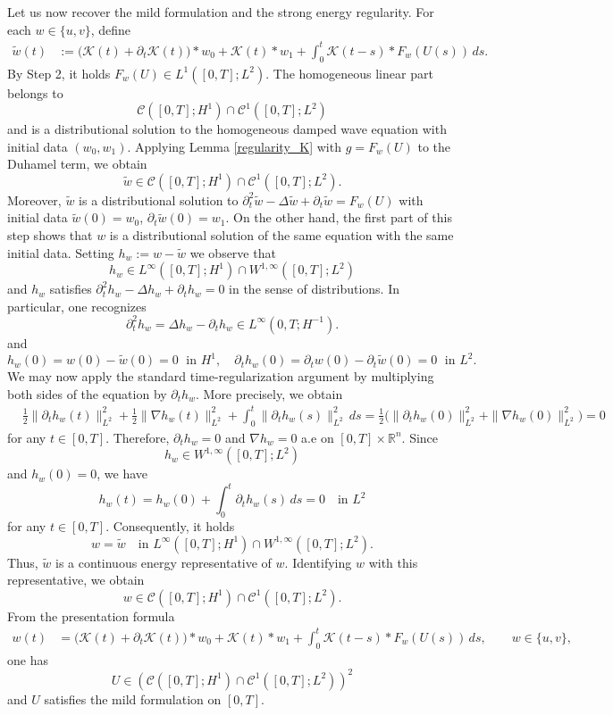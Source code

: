 \documentclass[11pt,reqno]{amsart}
\begin{document}
	Let us now recover the mild formulation and the strong energy regularity.
	For each $w\in\{u,v\}$, define
	\[
	\begin{aligned}
		\widetilde w(t)
		&:=\bigl(\mathcal K(t)+\partial_t\mathcal K(t)\bigr)*w_0
		+\mathcal K(t)*w_1
		+\int_0^t\mathcal K(t-s)*F_w(U(s))\,ds.
	\end{aligned}
	\]
	By Step 2, it holds $F_w(U)\in L^1([0,T];L^2)$. The homogeneous linear part belongs to
	\[
	\mathcal{C}([0,T];H^1)
	\cap \mathcal{C}^1([0,T];L^2)
	\]
	and is a distributional solution to the homogeneous damped wave equation with initial data $(w_0,w_1)$. Applying Lemma \ref{regularity_K} with $g=F_w(U)$ to the Duhamel term, we obtain
	\[
	\widetilde w\in \mathcal{C}([0,T];H^1)
	\cap \mathcal{C}^1([0,T];L^2).
	\]
	Moreover, $\widetilde w$ is a distributional solution to $\partial_t^2\widetilde w-\Delta\widetilde w
	+\partial_t\widetilde w=F_w(U)$ with initial data $\widetilde w(0)=w_0$, $\partial_t\widetilde w(0)=w_1$. On the other hand, the first part of this step shows that $w$ is a distributional solution of the same equation with the same initial data. Setting $h_w:=w-\widetilde w$ we observe that
	\[
	h_w\in L^\infty([0,T];H^1)\cap W^{1,\infty}([0,T];L^2)
	\]
	and $h_w$ satisfies $\partial_t^2h_w-\Delta h_w+\partial_th_w=0$ in the sense of distributions. In particular, one recognizes
	\[
	\partial_t^2h_w=\Delta h_w-\partial_th_w
	\in L^\infty(0,T;H^{-1}).
	\]
	and 
	\[
	h_w(0)=w(0)-\widetilde w(0)=0
	\;\text{ in }H^1,\quad \partial_th_w(0)=\partial_tw(0)-\partial_t\widetilde w(0)=0\;\text{ in }L^2.
	\]
	We may now apply the standard time-regularization argument by multiplying both sides of the equation by $\partial_th_w$. More precisely, we obtain
	\[
	\begin{aligned}
		&\frac12\|\partial_th_w(t)\|_{L^2}^2+\frac12\|\nabla h_w(t)\|_{L^2}^2+\int_0^t\|\partial_th_w(s)\|_{L^2}^2\,ds=\frac12\Big(\|\partial_th_w(0)\|_{L^2}^2+ \|\nabla h_w(0)\|_{L^2}^2\Big)=0
	\end{aligned}
	\]
	for any $t\in[0,T]$. Therefore, $\partial_th_w=0$ and $\nabla h_w=0$ a.e on $[0,T]\times\mathbb R^n$. Since 
	\[
	h_w\in W^{1,\infty}([0,T];L^2)
	\]
	and $h_w(0)=0$, we have
	\[
	h_w(t)=h_w(0)+\int_0^t\partial_th_w(s)\,ds=0 \quad\text{in }L^2
	\]
	for any $t\in[0,T]$. Consequently, it holds
	\[
	w=\widetilde w \quad\text{in }L^\infty([0,T];H^1)\cap W^{1,\infty}([0,T];L^2).
	\]
	Thus, $\widetilde w$ is a continuous energy representative of $w$. Identifying $w$ with this representative, we obtain
	\[
	w\in \mathcal{C}([0,T];H^1) \cap \mathcal{C}^1([0,T];L^2).
	\]
	From the presentation formula
	\[
	\begin{aligned}
		w(t)&=\bigl(\mathcal K(t)+\partial_t\mathcal K(t)\bigr)*w_0+\mathcal K(t)*w_1+\int_0^t\mathcal K(t-s)*F_w(U(s))\,ds,\qquad w\in\{u,v\},
	\end{aligned}
	\]
	one has
	\begin{equation}\label{remove_compact_eq10}
		U\in\left(\mathcal{C}([0,T];H^1)\cap \mathcal{C}^1([0,T];L^2)\right)^2
	\end{equation}
	and $U$ satisfies the mild formulation on $[0,T]$.
	
\end{document}
